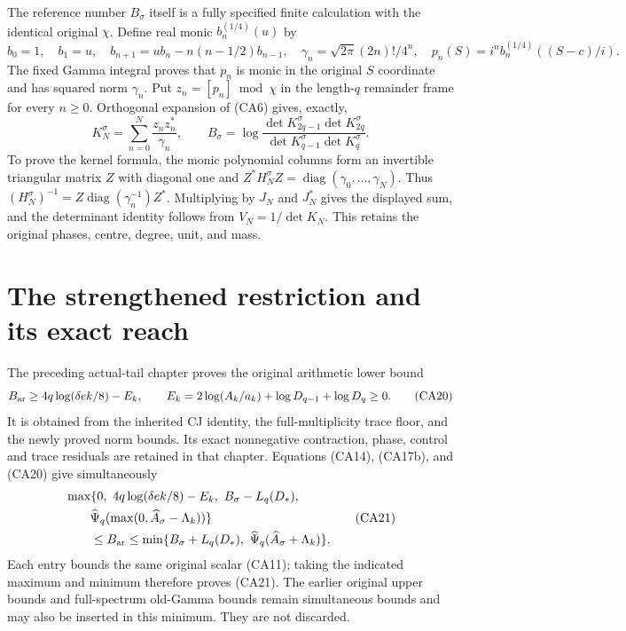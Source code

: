 The reference number $B_\sigma$ itself is a fully specified finite
calculation with the identical original $\chi$.  Define real monic
$b_n^{(1/4)}(u)$ by
\[
 b_0=1,\quad b_1=u,\quad
 b_{n+1}=ub_n-n(n-1/2)b_{n-1},\quad
 \gamma_n=\sqrt{2\pi}(2n)!/4^n,
 \quad p_n(S)=i^n b_n^{(1/4)}((S-c)/i).
 \tag{CA18}
\]
The fixed Gamma integral proves that $p_n$ is monic in the original
$S$ coordinate and has squared norm $\gamma_n$.  Put $z_n=[p_n]\bmod\chi$
in the length-$q$ remainder frame for every $n\ge0$.
Orthogonal expansion of (CA6) gives, exactly,
\[
 K_N^\sigma=\sum_{n=0}^N\frac{z_nz_n^*}{\gamma_n},\qquad
 B_\sigma=\log\frac{\det K_{2q-1}^\sigma\det K_{2q}^\sigma}
 {\det K_{q-1}^\sigma\det K_q^\sigma}.
 \tag{CA19}
\]
To prove the kernel formula, the monic polynomial columns form an
invertible triangular matrix $Z$ with diagonal one and
$Z^*H_N^\sigma Z=\operatorname{diag}(\gamma_0,\ldots,\gamma_N)$.
Thus $(H_N^\sigma)^{-1}=Z\operatorname{diag}(\gamma_n^{-1})Z^*$.
Multiplying by $J_N$ and $J_N^*$ gives the displayed sum, and the
determinant identity follows from $V_N=1/\det K_N$.
This retains the original phases, centre, degree, unit, and mass.

\section{The strengthened restriction and its exact reach}

The preceding actual-tail chapter proves the original arithmetic lower
bound
\[
 B_{\rm ar}\ge4q\log(\delta e k/8)-E_k,\qquad
 E_k=2\log(A_k/a_k)+\log D_{q-1}+\log D_q\ge0.
 \tag{CA20}
\]
It is obtained from the inherited CJ identity, the full-multiplicity
trace floor, and the newly proved norm bounds.  Its exact nonnegative
contraction, phase, control and trace residuals are retained in that
chapter.  Equations (CA14), (CA17b), and (CA20) give simultaneously
\[
 \begin{aligned}
 &\max\{0,\ 4q\log(\delta e k/8)-E_k,\ B_\sigma-L_q(D_*),\\
 &\qquad\widehat\Psi_q(\max(0,\widehat A_\sigma-\Lambda_k))\}
 \\&\qquad\le B_{\rm ar}\le
 \min\{B_\sigma+L_q(D_*),\ \widehat\Psi_q(\widehat A_\sigma+\Lambda_k)\}.
 \end{aligned}
 \tag{CA21}
\]
Each entry bounds the same original scalar (CA11); taking the indicated
maximum and minimum therefore proves (CA21).  The earlier original
upper bounds and full-spectrum old-Gamma bounds remain simultaneous
bounds and may also be inserted in this minimum.  They are not discarded.

